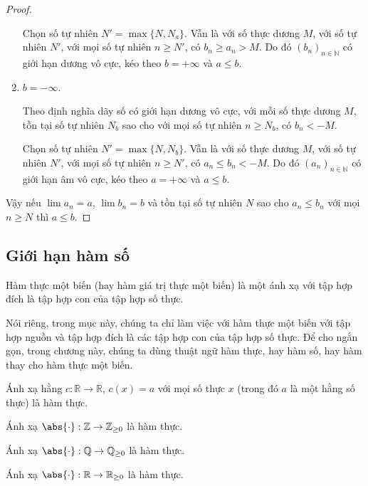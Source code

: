 \begin{proof}
\begin{enumerate}[label={\textbf{Trường hợp \arabic*.}},itemindent=1.6cm]
              Chọn số tự nhiên $N' = \max\{ N, N_{a} \}$. Vẫn là với số thực dương $M$, với số tự nhiên $N'$, với mọi số tự nhiên $n\geq N'$, có $b_{n}\geq a_{n} > M$. Do đó ${(b_{n})}_{n\in\mathbb{N}}$ có giới hạn dương vô cực, kéo theo $b = +\infty$ và $a\leq b$.
        \item $b = -\infty$.

              Theo định nghĩa dãy số có giới hạn dương vô cực, với mỗi số thực dương $M$, tồn tại số tự nhiên $N_{b}$ sao cho với mọi số tự nhiên $n\geq N_{b}$, có $b_{n} < -M$.

              Chọn số tự nhiên $N' = \max\{ N, N_{b} \}$. Vẫn là với số thực dương $M$, với số tự nhiên $N'$, với mọi số tự nhiên $n\geq N'$, có $a_{n}\leq b_{n} < -M$. Do đó ${(a_{n})}_{n\in\mathbb{N}}$ có giới hạn âm vô cực, kéo theo $a = +\infty$ và $a\leq b$.
    \end{enumerate}

    Vậy nếu $\lim a_{n} = a$, $\lim b_{n} = b$ và tồn tại số tự nhiên $N$ sao cho $a_{n}\leq b_{n}$ với mọi $n\geq N$ thì $a\leq b$.
\end{proof}

\subsection{Giới hạn hàm số}

\begin{definition}
    Hàm thực một biến (hay hàm giá trị thực một biến) là một ánh xạ với tập hợp đích là tập hợp con của tập hợp số thực.
\end{definition}

Nói riêng, trong mục này, chúng ta chỉ làm việc với hàm thực một biến với tập hợp nguồn và tập hợp đích là các tập hợp con của tập hợp số thực. Để cho ngắn gọn, trong chương này, chúng ta dùng thuật ngữ hàm thực, hay hàm số, hay hàm thay cho hàm thực một biến.

\begin{example}
    Ánh xạ hằng $c: \mathbb{R}\to \mathbb{R}$, $c(x) = a$ với mọi số thực $x$ (trong đó $a$ là một hằng số thực) là hàm thực.

    \noindent Ánh xạ $\abs{\cdot}: \mathbb{Z}\to \mathbb{Z}_{\geq 0}$ là hàm thực.

    \noindent Ánh xạ $\abs{\cdot}: \mathbb{Q}\to \mathbb{Q}_{\geq 0}$ là hàm thực.

    \noindent Ánh xạ $\abs{\cdot}: \mathbb{R}\to \mathbb{R}_{\geq 0}$ là hàm thực.
\end{example}

